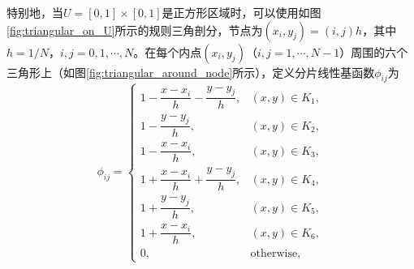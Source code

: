 \documentclass[a4paper,10pt]{ctexart}
\begin{document}
特别地，当$ U = [0,1]\times [0,1] $是正方形区域时，可以使用如图\ref{fig:triangular_on_U}所示的规则三角剖分，节点为$ (x_i,y_j) = (i,j)h $，其中$ h = 1/N $，$ i,j = 0,1,\cdots ,N $。在每个内点$ (x_i,y_j) $（$ i,j=1,\cdots ,N-1 $）周围的六个三角形上（如图\ref{fig:triangular_around_node}所示），定义分片线性基函数$ \phi_{ij} $为
\begin{equation}
    \phi_{ij} = 
    \begin{cases}
        1 - \dfrac{x-x_i}{h} - \dfrac{y-y_j}{h}, & (x,y)\in K_1,\\
        1 - \dfrac{y-y_j}{h}, & (x,y)\in K_2,\\
        1 - \dfrac{x-x_i}{h}, & (x,y)\in K_3,\\
        1 + \dfrac{x-x_i}{h} + \dfrac{y-y_j}{h}, & (x,y)\in K_4,\\
        1 + \dfrac{y-y_j}{h}, & (x,y)\in K_5,\\
        1 + \dfrac{x-x_i}{h}, & (x,y)\in K_6,\\
        0, & \text{otherwise},
    \end{cases}
\end{equation}
\end{document}
